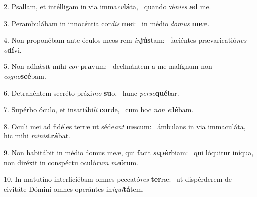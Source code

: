 2. Psallam, et intélligam in via imma\textit{cu}\textbf{lá}ta, \ast\  quando vé\textit{ni}\textit{es} \textbf{ad} me.\

3. Perambulábam in innocéntia cor\textit{dis} \textbf{me}i: \ast\  in médio \textit{do}\textit{mus} \textbf{me}æ.\

4. Non proponébam ante óculos meos rem \textit{in}\textbf{jús}tam: \ast\  faciéntes prævaricatió\textit{nes} \textit{o}\textbf{dí}vi.\

5. Non adhǽsit mihi \textit{cor} \textbf{pra}vum: \ast\  declinántem a me malígnum non \textit{co}\textit{gno}\textbf{scé}bam.\

6. Detrahéntem secréto próxi\textit{mo} \textbf{su}o, \ast\  hunc \textit{per}\textit{se}\textbf{qué}bar.\

7. Supérbo óculo, et insatiábi\textit{li} \textbf{cor}de, \ast\  cum hoc \textit{non} \textit{e}\textbf{dé}bam.\

8. Oculi mei ad fidéles terræ ut séde\textit{ant} \textbf{me}cum: \ast\  ámbulans in via immaculáta, hic mihi \textit{mi}\textit{nis}\textbf{trá}bat.\

9. Non habitábit in médio domus meæ, qui facit \textit{su}\textbf{pér}biam: \ast\  qui lóquitur iníqua, non diréxit in conspéctu oculó\textit{rum} \textit{me}\textbf{ó}rum.\

10. In matutíno interficiébam omnes peccató\textit{res} \textbf{ter}ræ: \ast\  ut dispérderem de civitáte Dómini omnes operántes in\textit{i}\textit{qui}\textbf{tá}tem.\


